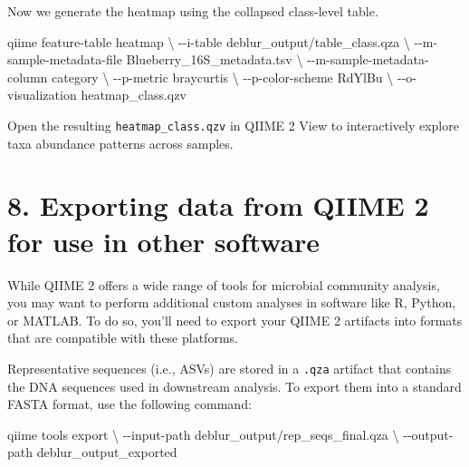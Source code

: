 \documentclass[
]{book}
\newenvironment{Shaded}{\begin{snugshade}}{\end{snugshade}}
\newcommand{\AttributeTok}[1]{\textcolor[rgb]{0.13,0.29,0.53}{#1}}
\newcommand{\DataTypeTok}[1]{\textcolor[rgb]{0.13,0.29,0.53}{#1}}
\newcommand{\ExtensionTok}[1]{#1}
\newcommand{\NormalTok}[1]{#1}
\begin{document}
Now we generate the heatmap using the collapsed class-level table.

\begin{Shaded}
\begin{Highlighting}[]
\ExtensionTok{qiime}\NormalTok{ feature{-}table heatmap }\DataTypeTok{\textbackslash{}}
  \AttributeTok{{-}{-}i{-}table}\NormalTok{ deblur\_output/table\_class.qza }\DataTypeTok{\textbackslash{}}
  \AttributeTok{{-}{-}m{-}sample{-}metadata{-}file}\NormalTok{ Blueberry\_16S\_metadata.tsv }\DataTypeTok{\textbackslash{}}
  \AttributeTok{{-}{-}m{-}sample{-}metadata{-}column}\NormalTok{ category }\DataTypeTok{\textbackslash{}}
  \AttributeTok{{-}{-}p{-}metric}\NormalTok{ braycurtis }\DataTypeTok{\textbackslash{}}
  \AttributeTok{{-}{-}p{-}color{-}scheme}\NormalTok{ RdYlBu }\DataTypeTok{\textbackslash{}}
  \AttributeTok{{-}{-}o{-}visualization}\NormalTok{ heatmap\_class.qzv}
\end{Highlighting}
\end{Shaded}

Open the resulting \texttt{heatmap\_class.qzv} in QIIME 2 View to interactively explore taxa abundance patterns across samples.

\section{8. Exporting data from QIIME 2 for use in other software}\label{exporting-data}

While QIIME 2 offers a wide range of tools for microbial community analysis, you may want to perform additional custom analyses in software like R, Python, or MATLAB. To do so, you'll need to export your QIIME 2 artifacts into formats that are compatible with these platforms.

Representative sequences (i.e., ASVs) are stored in a \texttt{.qza} artifact that contains the DNA sequences used in downstream analysis. To export them into a standard FASTA format, use the following command:

\begin{Shaded}
\begin{Highlighting}[]
\ExtensionTok{qiime}\NormalTok{ tools export }\DataTypeTok{\textbackslash{}}
   \AttributeTok{{-}{-}input{-}path}\NormalTok{ deblur\_output/rep\_seqs\_final.qza }\DataTypeTok{\textbackslash{}}
   \AttributeTok{{-}{-}output{-}path}\NormalTok{ deblur\_output\_exported}
\end{Highlighting}
\end{Shaded}
\end{document}
